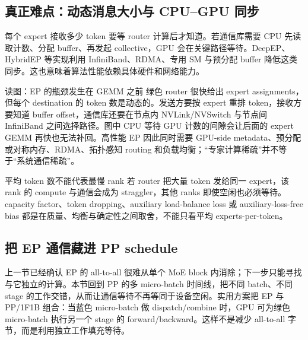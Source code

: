 
\subsection{真正难点：动态消息大小与 CPU--GPU 同步}

每个 expert 接收多少 token 要等 router 计算后才知道。若通信库需要 CPU 先读取计数、分配 buffer、再发起 collective，GPU 会在关键路径等待。DeepEP、HybridEP 等实现利用 InfiniBand、RDMA、专用 SM 与预分配 buffer 降低这类同步。这也意味着算法性能依赖具体硬件和网络能力。


\begin{knowledgebox}{读图：EP 的瓶颈发生在 GEMM 之前}
绿色 router 很快给出 expert assignments，但每个 destination 的 token 数是动态的。发送方要按 expert 重排 token，接收方要知道 buffer offset，通信库还要在节点内 NVLink/NVSwitch 与节点间 InfiniBand 之间选择路径。图中 CPU 等待 GPU 计数的间隙会让后面的 expert GEMM 再快也无法补回。高性能 EP 因此同时需要 GPU-side metadata、预分配或对称内存、RDMA、拓扑感知 routing 和负载均衡；“专家计算稀疏”并不等于“系统通信稀疏”。
\end{knowledgebox}



\begin{warningbox}{平均 token 数不能代表最慢 rank}
若 router 把大量 token 发给同一 expert，该 rank 的 compute 与通信会成为 straggler，其他 ranks 即使空闲也必须等待。capacity factor、token dropping、auxiliary load-balance loss 或 auxiliary-loss-free bias 都是在质量、均衡与确定性之间取舍，不能只看平均 experts-per-token。
\end{warningbox}

\subsection{把 EP 通信藏进 PP schedule}

上一节已经确认 EP 的 all-to-all 很难从单个 MoE block 内消除；下一步只能寻找与它独立的计算。本节回到 PP 的多 micro-batch 时间线，把不同 batch、不同 stage 的工作交错，从而让通信等待不再等同于设备空闲。实用方案把 EP 与 PP/1F1B 组合：当蓝色 micro-batch 做 dispatch/combine 时，GPU 可为绿色 micro-batch 执行另一个 stage 的 forward/backward。这样不是减少 all-to-all 字节，而是利用独立工作填充等待。

